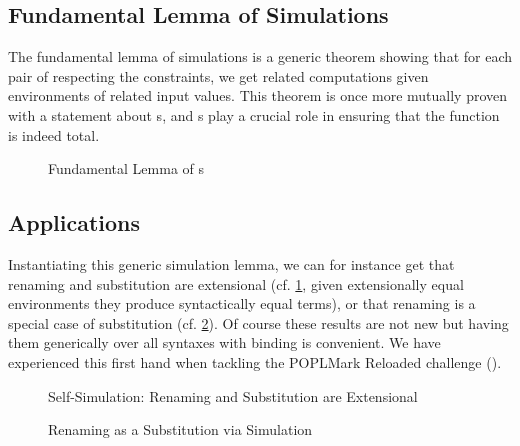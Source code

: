 
\subsection{Fundamental Lemma of Simulations}

The fundamental lemma of simulations is a generic theorem showing that for
each pair of  respecting the  constraints, we
get related computations given environments of related input values. This
theorem is once more mutually proven with a statement about s,
and s play a crucial role in ensuring that the function is indeed total.

\begin{figure}[h]
\caption{Fundamental Lemma of s}
\end{figure}

\subsection{Applications}

Instantiating this generic simulation lemma, we can for instance get
that renaming and substitution are extensional (cf. \cref{fig:genrensubext},
given extensionally equal environments they produce syntactically equal terms),
or that renaming is a special case of substitution (cf. \cref{fig:genrensub}).
Of course these results are not new but having them generically over all syntaxes
with binding is convenient. We have experienced this first hand when tackling the
POPLMark Reloaded challenge (\citeyear{poplmark2}).

\begin{figure}[h]
\caption{Self-Simulation: Renaming and Substitution are Extensional\label{fig:genrensubext}}
\end{figure}

\begin{figure}[h]
\caption{Renaming as a Substitution via Simulation\label{fig:genrensub}}
\end{figure}

